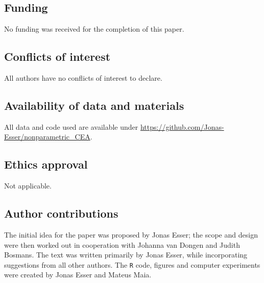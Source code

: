 \documentclass[aoas,preprint]{imsart}
\theoremstyle{plain}
\theoremstyle{definition}
\theoremstyle{remark}
\theoremstyle{remark}
\begin{document}
\subsection{Funding}
No funding was received for the completion of this paper.

\subsection{Conflicts of interest}
All authors have no conflicts of interest to declare.

\subsection{Availability of data and materials}
All data and code used are available under \url{https://github.com/Jonas-Esser/nonparametric_CEA}.

\subsection{Ethics approval}
Not applicable.

\subsection{Author contributions}
The initial idea for the paper was proposed by Jonas Esser; the scope and design were then worked out in cooperation with Johanna van Dongen and Judith Bosmans. The text was written primarily by Jonas Esser, while incorporating suggestions from all other authors. The \texttt{R} code, figures and computer experiments were created by Jonas Esser and Mateus Maia.

{}





\clearpage
\setcounter{subsection}{0}
\renewcommand\thesubsection{\Alph{subsection}}
\renewcommand\thefigure{\thesubsection.\arabic{figure}}
\renewcommand\thetable{\thesubsection.\arabic{table}}
\end{document}
